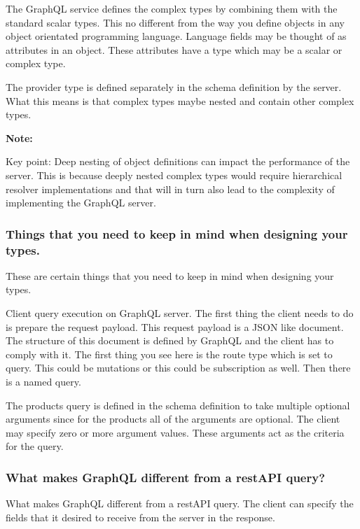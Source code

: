 \documentclass[a4paper, 11pt]{book}
\newenvironment{note}{
    \begin{siderule}
        \textbf{Note: }
        }{
    \end{siderule}
}
\begin{document}
    The GraphQL service defines the complex types by combining them with the standard scalar types.
    This no different from the way you define objects in any object orientated programming language.
    Language fields may be thought of as attributes in an object.
    These attributes have a type which may be a scalar or complex type.


    The provider type is defined separately in the schema definition by the server.
    What this means is that complex types maybe nested and contain other complex types.

    \begin{note}
        Key point: Deep nesting of object definitions can impact the performance of the server. %
        This is because deeply nested complex types would require hierarchical resolver implementations and that will in turn also lead to the complexity of implementing the GraphQL server.
    \end{note}

    \subsubsection{Things that you need to keep in mind when designing your types.}

    These are certain things that you need to keep in mind when designing your types.

    Client query execution on GraphQL server.
    The first thing the client needs to do is prepare the request payload.
    This request payload is a JSON like document.
    The structure of this document is defined by GraphQL and the client has to comply with it.
    The first thing you see here is the route type which is set to query.
    This could be mutations or this could be subscription as well.
    Then there is a named query.

    The products query is defined in the schema definition to take multiple optional arguments since for the products all of the arguments are optional.
    The client may specify zero or more argument values.
    These arguments act as the criteria for the query.

    \subsubsection{What makes GraphQL different from a restAPI query?}
    What makes GraphQL different from a restAPI query.
    The client can specify the fields that it desired to receive from the server in the response.
\end{document}
